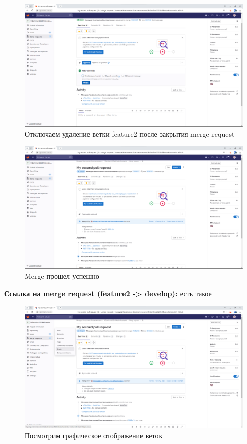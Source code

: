 \documentclass[a4paper]{article}
\begin{document}
  \begin{figure}[H]
    \centering
    \includegraphics[width=\textwidth]{1_ (4)}
    \caption{Отключаем удаление ветки feature2 после закрытия merge request}
  \end{figure}

  \begin{figure}[H]
    \centering
    \includegraphics[width=\textwidth]{1_ (3)}
    \caption{Merge прошел успешно}
  \end{figure}

  \textbf{Ссылка на merge request (feature2 -> develop):} \href{https://git.miem.hse.ru/kkmikhedov/prseminar2023mikhedovkonstantin/-/merge_requests/2}{есть такое}

  \begin{figure}[H]
    \centering
    \includegraphics[width=\textwidth]{1_ (2)}
    \caption{Посмотрим графическое отображение веток}
  \end{figure}
\end{document}
